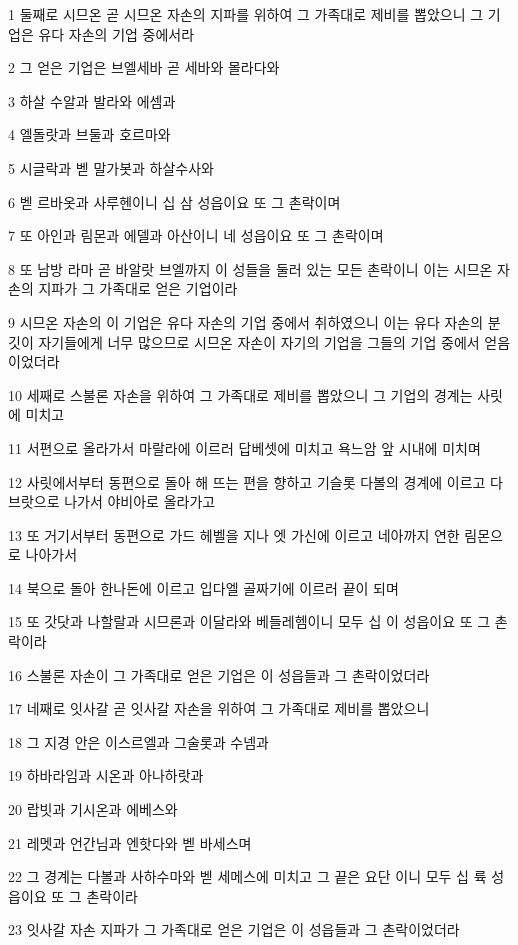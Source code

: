 \par 1 둘째로 시므온 곧 시므온 자손의 지파를 위하여 그 가족대로 제비를 뽑았으니 그 기업은 유다 자손의 기업 중에서라
\par 2 그 얻은 기업은 브엘세바 곧 세바와 몰라다와
\par 3 하살 수알과 발라와 에셈과
\par 4 엘돌랏과 브둘과 호르마와
\par 5 시글락과 벧 말가봇과 하살수사와
\par 6 벧 르바옷과 사루헨이니 십 삼 성읍이요 또 그 촌락이며
\par 7 또 아인과 림몬과 에델과 아산이니 네 성읍이요 또 그 촌락이며
\par 8 또 남방 라마 곧 바알랏 브엘까지 이 성들을 둘러 있는 모든 촌락이니 이는 시므온 자손의 지파가 그 가족대로 얻은 기업이라
\par 9 시므온 자손의 이 기업은 유다 자손의 기업 중에서 취하였으니 이는 유다 자손의 분깃이 자기들에게 너무 많으므로 시므온 자손이 자기의 기업을 그들의 기업 중에서 얻음이었더라
\par 10 세째로 스불론 자손을 위하여 그 가족대로 제비를 뽑았으니 그 기업의 경계는 사릿에 미치고
\par 11 서편으로 올라가서 마랄라에 이르러 답베셋에 미치고 욕느암 앞 시내에 미치며
\par 12 사릿에서부터 동편으로 돌아 해 뜨는 편을 향하고 기슬롯 다볼의 경계에 이르고 다브랏으로 나가서 야비아로 올라가고
\par 13 또 거기서부터 동편으로 가드 헤벨을 지나 엣 가신에 이르고 네아까지 연한 림몬으로 나아가서
\par 14 북으로 돌아 한나돈에 이르고 입다엘 골짜기에 이르러 끝이 되며
\par 15 또 갓닷과 나할랄과 시므론과 이달라와 베들레헴이니 모두 십 이 성읍이요 또 그 촌락이라
\par 16 스불론 자손이 그 가족대로 얻은 기업은 이 성읍들과 그 촌락이었더라
\par 17 네째로 잇사갈 곧 잇사갈 자손을 위하여 그 가족대로 제비를 뽑았으니
\par 18 그 지경 안은 이스르엘과 그술롯과 수넴과
\par 19 하바라임과 시온과 아나하랏과
\par 20 랍빗과 기시온과 에베스와
\par 21 레멧과 언간님과 엔핫다와 벧 바세스며
\par 22 그 경계는 다볼과 사하수마와 벧 세메스에 미치고 그 끝은 요단 이니 모두 십 륙 성읍이요 또 그 촌락이라
\par 23 잇사갈 자손 지파가 그 가족대로 얻은 기업은 이 성읍들과 그 촌락이었더라
